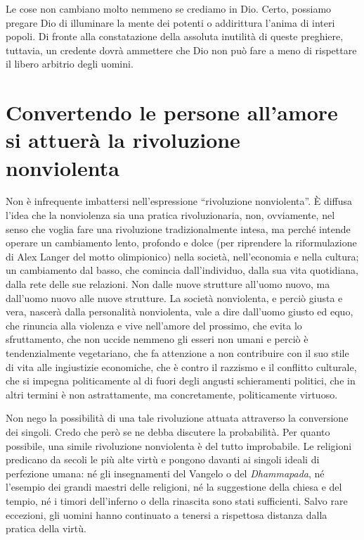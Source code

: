\documentclass[12pt,oneside,openany]{book}
\begin{document}
Le cose non cambiano molto nemmeno se crediamo in Dio. Certo, possiamo pregare Dio di illuminare la mente dei potenti o addirittura l'anima di interi popoli. Di fronte alla constatazione della assoluta inutilità di queste preghiere, tuttavia, un credente dovrà ammettere che Dio non può fare a meno di rispettare il libero arbitrio degli uomini.

\setcounter{chapter}{4}\addtocounter{chapter}{-1}

\chapter{Convertendo le persone all’amore si attuerà la rivoluzione nonviolenta}

Non è infrequente imbattersi nell'espressione ``rivoluzione nonviolenta''. È diffusa l'idea che la nonviolenza sia una pratica rivoluzionaria, non, ovviamente, nel senso che voglia fare una rivoluzione tradizionalmente intesa, ma perché intende operare un cambiamento lento, profondo e dolce (per riprendere la riformulazione di Alex Langer del motto olimpionico) nella società, nell'economia e nella cultura; un cambiamento dal basso, che comincia dall'individuo, dalla sua vita quotidiana, dalla rete delle sue relazioni. Non dalle nuove strutture all'uomo nuovo, ma dall'uomo nuovo alle nuove strutture. La società nonviolenta, e perciò giusta e vera, nascerà dalla personalità nonviolenta, vale a dire dall'uomo giusto ed equo, che rinuncia alla violenza e vive nell'amore del prossimo, che evita lo sfruttamento, che non uccide nemmeno gli esseri non umani e perciò è tendenzialmente vegetariano, che fa attenzione a non contribuire con il suo stile di vita alle ingiustizie economiche, che è contro il razzismo e il conflitto culturale, che si impegna politicamente al di fuori degli angusti schieramenti politici, che in altri termini è non astrattamente, ma concretamente, politicamente virtuoso.



Non nego la possibilità di una tale rivoluzione attuata attraverso la conversione dei singoli. Credo che però se ne debba discutere la probabilità. Per quanto possibile, una simile rivoluzione nonviolenta è del tutto improbabile. Le religioni predicano da secoli le più alte virtù e pongono davanti ai singoli ideali di perfezione umana: né gli insegnamenti del Vangelo o del \emph{Dhammapada}, né l'esempio dei grandi maestri delle religioni, né la suggestione della chiesa e del tempio, né i timori dell'inferno o della rinascita sono stati sufficienti. Salvo rare eccezioni, gli uomini hanno continuato a tenersi a rispettosa distanza dalla pratica della virtù.
\end{document}
